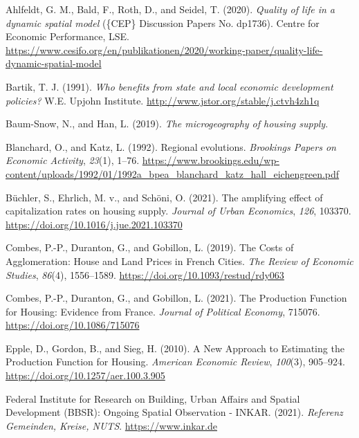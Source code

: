 \documentclass[
  12pt,
]{article}
\newlength{\cslhangindent}
\newenvironment{CSLReferences}[2] %
 {\begin{list}{}{%
  \setlength{\itemindent}{0pt}
  \setlength{\leftmargin}{0pt}
  \setlength{\parsep}{0pt}
  \ifodd #1
   \setlength{\leftmargin}{\cslhangindent}
   \setlength{\itemindent}{-1\cslhangindent}
  \fi
  \setlength{\itemsep}{#2\baselineskip}}}
 {\end{list}}
\begin{document}
\label{refs}
\begin{CSLReferences}{1}{0}
Ahlfeldt, G. M., Bald, F., Roth, D., and Seidel, T. (2020). \emph{Quality of life in a dynamic spatial model} (\{CEP\} Discussion Papers No. dp1736). Centre for Economic Performance, {LSE}. \url{https://www.cesifo.org/en/publikationen/2020/working-paper/quality-life-dynamic-spatial-model}

Bartik, T. J. (1991). \emph{Who benefits from state and local economic development policies?} W.E. Upjohn Institute. \url{http://www.jstor.org/stable/j.ctvh4zh1q}

Baum-Snow, N., and Han, L. (2019). \emph{The microgeography of housing supply}.

Blanchard, O., and Katz, L. (1992). Regional evolutions. \emph{Brookings Papers on Economic Activity}, \emph{23}(1), 1--76. \url{https://www.brookings.edu/wp-content/uploads/1992/01/1992a_bpea_blanchard_katz_hall_eichengreen.pdf}

Büchler, S., Ehrlich, M. v., and Schöni, O. (2021). The amplifying effect of capitalization rates on housing supply. \emph{Journal of Urban Economics}, \emph{126}, 103370. \url{https://doi.org/10.1016/j.jue.2021.103370}

Combes, P.-P., Duranton, G., and Gobillon, L. (2019). The Costs of Agglomeration: House and Land Prices in {French} Cities. \emph{The Review of Economic Studies}, \emph{86}(4), 1556--1589. \url{https://doi.org/10.1093/restud/rdy063}

Combes, P.-P., Duranton, G., and Gobillon, L. (2021). The Production Function for Housing: Evidence from {France}. \emph{Journal of Political Economy}, 715076. \url{https://doi.org/10.1086/715076}

Epple, D., Gordon, B., and Sieg, H. (2010). A New Approach to Estimating the Production Function for Housing. \emph{American Economic Review}, \emph{100}(3), 905--924. \url{https://doi.org/10.1257/aer.100.3.905}

Federal Institute for Research on Building, Urban Affairs and Spatial Development (BBSR): Ongoing Spatial Observation - INKAR. (2021). \emph{{Referenz Gemeinden, Kreise, NUTS}}. \url{https://www.inkar.de}


\end{CSLReferences}
\end{document}
